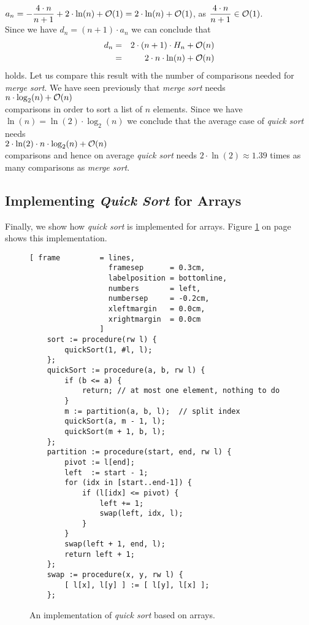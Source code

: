 $\displaystyle a_n = - \frac{4 \cdot n}{n+1}  + 2 \cdot \ln(n) + \mathcal{O}(1) =  2 \cdot \ln(n) + \mathcal{O}(1)$,
\quad as \quad $\displaystyle \frac{4 \cdot n}{n+1} \in \mathcal{O}(1)$.
\\[0.2cm]
Since we have $d_n = (n+1) \cdot a_{n}$ we can conclude that
\begin{eqnarray*}  
 d_n & = &  2 \cdot(n+1) \cdot H_n + \mathcal{O}(n) \\
     & = & 2 \cdot n \cdot \ln(n) + \mathcal{O}(n)
\end{eqnarray*}
holds.  Let us compare this result with the number of comparisons needed for \emph{merge sort}.
We have seen previously that \emph{merge sort} needs
\\[0.2cm]
\hspace*{1.3cm} $n \cdot \log_2(n) + \mathcal{O}(n)$ \\[0.2cm]
comparisons in order to sort a list of $n$ elements.  Since we have $\ln(n) = \ln(2) \cdot \log_2(n)$
we conclude that the average case of \emph{quick sort} needs
 \\[0.2cm]
\hspace*{1.3cm} $2 \cdot \ln(2) \cdot n \cdot \log_2(n) + \mathcal{O}(n)$ \\[0.2cm]
comparisons and hence on average \emph{quick sort} needs  $2 \cdot \ln(2) \approx 1.39$ times as many comparisons as
\emph{merge sort}.  


\subsection{Implementing \emph{Quick Sort} for Arrays}
Finally, we show how \emph{quick sort}  is implemented for arrays.  Figure
\ref{fig:quick-sort-array.stlx} on page \pageref{fig:quick-sort-array.stlx} shows this implementation. 

\begin{figure}[!ht]
  \centering
\begin{Verbatim}[ frame         = lines, 
                  framesep      = 0.3cm, 
                  labelposition = bottomline,
                  numbers       = left,
                  numbersep     = -0.2cm,
                  xleftmargin   = 0.0cm,
                  xrightmargin  = 0.0cm
                ]
    sort := procedure(rw l) {
        quickSort(1, #l, l);
    };
    quickSort := procedure(a, b, rw l) {
        if (b <= a) {
            return; // at most one element, nothing to do
        }
        m := partition(a, b, l);  // split index
        quickSort(a, m - 1, l);
        quickSort(m + 1, b, l);
    };
    partition := procedure(start, end, rw l) {
        pivot := l[end];
        left  := start - 1;
        for (idx in [start..end-1]) {
            if (l[idx] <= pivot) {
                left += 1;
                swap(left, idx, l);
            }
        }
        swap(left + 1, end, l);
        return left + 1;
    };    
    swap := procedure(x, y, rw l) {
        [ l[x], l[y] ] := [ l[y], l[x] ];
    };
\end{Verbatim}
\vspace*{-0.3cm}
  \caption{An implementation of \emph{quick sort} based on arrays.}
  \label{fig:quick-sort-array.stlx}
\end{figure}


